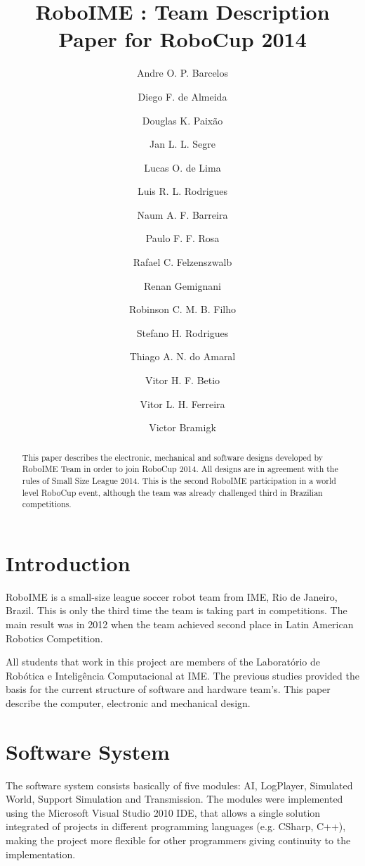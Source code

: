 \documentclass{llncs}
\begin{document}
\title{RoboIME : Team Description Paper for RoboCup 2014}
\author{
 Andre O. P. Barcelos \and
 Diego F. de Almeida \and
 Douglas K. Paixão \and
 Jan L. L. Segre \and
 Lucas O. de Lima \and
 Luis R. L. Rodrigues \and
 Naum A. F. Barreira \and
 Paulo F. F. Rosa \and
 Rafael C. Felzenszwalb \and
 Renan Gemignani \and
 Robinson C. M. B. Filho \and
 Stefano H. Rodrigues \and
 Thiago A. N. do Amaral \and
 Vitor H. F. Betio \and
 Vitor L. H. Ferreira \and
 Victor Bramigk
}

\maketitle
%
\begin{abstract}
This paper describes the electronic, mechanical and software designs developed by RoboIME Team in order to join RoboCup 2014. All designs are in agreement with the rules of Small Size League 2014. This is the second RoboIME participation in a world level RoboCup event, although the team was already challenged third in Brazilian competitions.
\end{abstract}

\section{Introduction}
    RoboIME is a small-size league soccer robot team from IME, Rio de Janeiro, Brazil. This is only the third time the team is taking part in competitions. The main result was in 2012 when the team achieved second place in Latin American Robotics Competition.

All students that work in this project are members of the Laboratório de Robótica e Inteligência Computacional at IME. The previous studies \cite{alexandre}\cite{marco} provided the basis for the current structure of software and hardware team's. This paper describe the computer, electronic and mechanical design.

\section{Software System}
	The software system consists basically of five modules: AI, LogPlayer, Simulated World, Support Simulation and Transmission. The modules were implemented using the Microsoft Visual Studio 2010 IDE, that allows a single solution integrated of projects in different programming languages (e.g. CSharp, C++), making the project more flexible for other programmers giving continuity to the implementation. 
\end{document}
